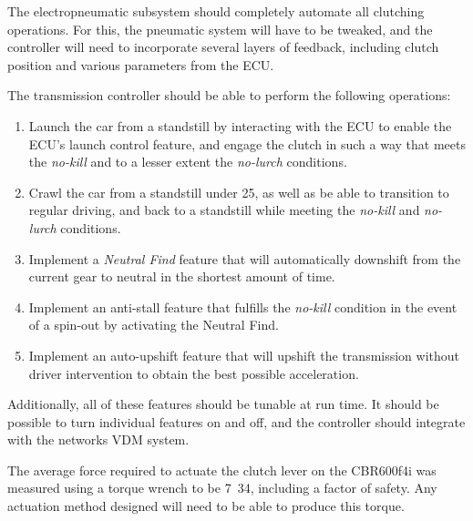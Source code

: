 The electropneumatic subsystem should completely automate all clutching operations. For this, the pneumatic system will have to be tweaked, and the controller will need to incorporate several layers of feedback, including clutch position and various parameters from the ECU.

The transmission controller should be able to perform the following operations:
\begin{enumerate}
  \item Launch the car from a standstill by interacting with the ECU to enable the ECU's launch control feature, and engage the clutch in such a way that meets the \emph{no-kill} and to a lesser extent the \emph{no-lurch} conditions.
  \item Crawl the car from a standstill under \unit{25}{\kilo\metre\per\hour}, as well as be able to transition to regular driving, and back to a standstill while meeting the \emph{no-kill} and \emph{no-lurch} conditions.
  \item Implement a \emph{Neutral Find} feature that will automatically downshift from the current gear to neutral in the shortest amount of time.
  \item Implement an anti-stall feature that fulfills the \emph{no-kill} condition in the event of a spin-out by activating the Neutral Find.
  \item Implement an auto-upshift feature that will upshift the transmission without driver intervention to obtain the best possible acceleration.
\end{enumerate}

Additionally, all of these features should be tunable at run time. It should be possible to turn individual features on and off, and the controller should integrate with the networks VDM system.

The average force required to actuate the clutch lever on the CBR600f4i was measured using a torque wrench to be \unit{7.34}{\newton\metre}, including a factor of safety. Any actuation method designed will need to be able to produce this torque.